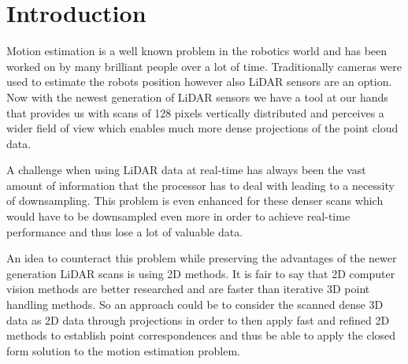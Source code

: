 \chapter{Introduction}
\label{sec:introduction}

Motion estimation is a well known problem in the robotics world and has been worked on by many brilliant people over a lot of time. Traditionally cameras were used to estimate the robots position however also LiDAR sensors are an option. Now with the newest generation of LiDAR sensors we have a tool 
at our hands that provides us with scans of 128 pixels vertically distributed and 
perceives a wider field of view which enables much more dense projections of 
the point cloud data. 

A challenge when using LiDAR data at real-time has always been the vast amount of information that the processor has to deal with leading to a necessity of downsampling. This problem is even enhanced for these denser scans which would have to be downsampled even more in order to achieve real-time performance and thus lose a lot of valuable data. 

An idea to counteract this problem while preserving the advantages of the newer generation LiDAR scans is using 2D methods. It is fair to say that 2D computer vision methods are better researched and are faster than iterative 3D point handling methods. So an approach could be to consider the scanned dense 3D data as 2D data through projections in order to then apply fast and refined 2D methods to establish point correspondences and thus be able to apply the closed form solution to the motion estimation problem.




 